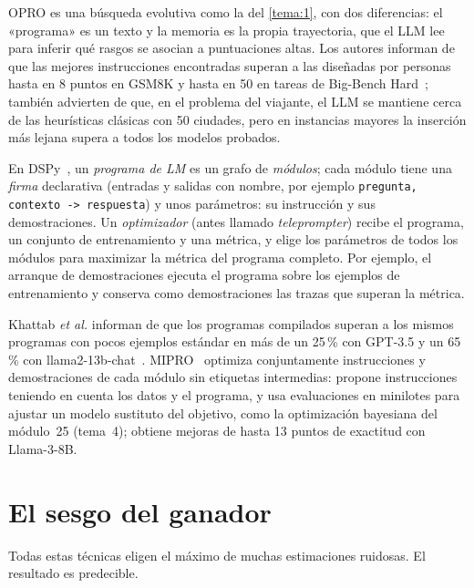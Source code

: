 OPRO es una búsqueda evolutiva como la del \cref{tema:1}, con dos diferencias: el «programa» es un texto y la memoria es la propia trayectoria, que el LLM lee para inferir qué rasgos se asocian a puntuaciones altas. Los autores informan de que las mejores instrucciones encontradas superan a las diseñadas por personas hasta en 8 puntos en GSM8K y hasta en 50 en tareas de Big-Bench Hard~\cite{opro}; también advierten de que, en el problema del viajante, el LLM se mantiene cerca de las heurísticas clásicas con 50 ciudades, pero en instancias mayores la inserción más lejana supera a todos los modelos probados.

\begin{definicion}\label{def:dspy}
En DSPy~\cite{dspy}, un \emph{programa de LM} es un grafo de \emph{módulos}; cada módulo tiene una \emph{firma} declarativa (entradas y salidas con nombre, por ejemplo \texttt{pregunta, contexto -> respuesta}) y unos parámetros: su instrucción y sus demostraciones. Un \emph{optimizador} (antes llamado \emph{teleprompter}) recibe el programa, un conjunto de entrenamiento y una métrica, y elige los parámetros de todos los módulos para maximizar la métrica del programa completo. Por ejemplo, el arranque de demostraciones ejecuta el programa sobre los ejemplos de entrenamiento y conserva como demostraciones las trazas que superan la métrica.
\end{definicion}

Khattab \emph{et al.} informan de que los programas compilados superan a los mismos programas con pocos ejemplos estándar en más de un 25\,\% con GPT-3.5 y un 65\,\% con llama2-13b-chat~\cite{dspy}. MIPRO~\cite{mipro} optimiza conjuntamente instrucciones y demostraciones de cada módulo sin etiquetas intermedias: propone instrucciones teniendo en cuenta los datos y el programa, y usa evaluaciones en minilotes para ajustar un modelo sustituto del objetivo, como la optimización bayesiana del módulo~25 (tema~4); obtiene mejoras de hasta 13 puntos de exactitud con Llama-3-8B.

\section{El sesgo del ganador}

Todas estas técnicas eligen el máximo de muchas estimaciones ruidosas. El resultado es predecible.

